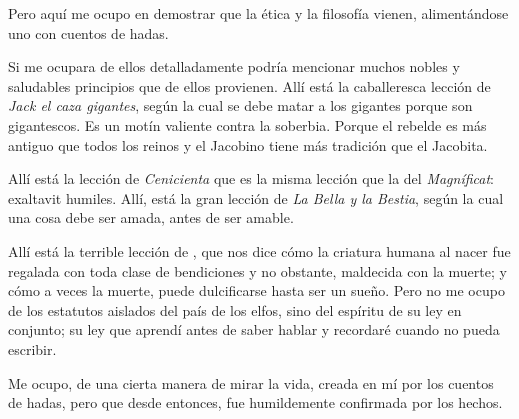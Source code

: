 Pero aquí me ocupo en demostrar que la ética y la filosofía vienen, alimentándose uno con cuentos
de hadas.

Si me ocupara de ellos detalladamente podría mencionar muchos nobles y saludables principios que
de ellos provienen. Allí está la caballeresca lección de \emph{Jack el caza gigantes}, según la cual se debe matar a los
gigantes porque son gigantescos. Es un motín valiente contra la soberbia. Porque el rebelde es más
antiguo que todos los reinos y el Jacobino tiene más tradición que el Jacobita.

Allí está la lección de \emph{Cenicienta} que es la misma lección que la del \emph{Magníficat}:  exaltavit humiles.
Allí, está la gran lección de \emph{La Bella y la Bestia}, según la cual una cosa debe ser amada, antes de
ser amable.

Allí está la terrible lección de , que nos dice cómo la criatura humana al nacer
fue regalada con toda clase de bendiciones y no obstante, maldecida con la muerte; y cómo a veces la
muerte, puede dulcificarse hasta ser un sueño. Pero no me ocupo de los estatutos aislados del país de los
elfos, sino del espíritu de su ley en conjunto; su ley que aprendí antes de saber hablar y recordaré cuando
no pueda escribir.

Me ocupo, de una cierta manera de mirar la vida, creada en mí por los cuentos de hadas, pero que
desde entonces, fue humildemente confirmada por los hechos.

